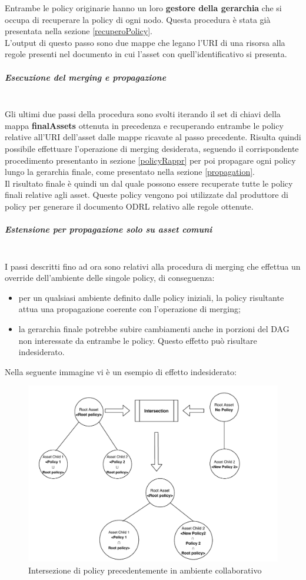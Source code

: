 \documentclass[12pt,a4paper,twoside]{book}
\begin{document}
Entrambe le policy originarie hanno un loro \textbf{gestore della gerarchia} che si occupa di recuperare la policy di ogni nodo. Questa procedura è stata già presentata nella sezione \ref{recuperoPolicy}.\\
L'output di questo passo sono due mappe che legano l'URI di una risorsa alla regole presenti nel documento in cui l'asset con quell'identificativo si presenta. 
\subparagraph{Esecuzione del merging e propagazione}\mbox{}\\
Gli ultimi due passi della procedura sono svolti iterando il set di chiavi della mappa \textbf{finalAssets} ottenuta in precedenza e recuperando entrambe le policy relative all'URI dell'asset dalle mappe ricavate al passo precedente. Risulta quindi possibile effettuare l'operazione di merging desiderata, seguendo il corrispondente procedimento presentanto in sezione \ref{policyRappr} per poi propagare ogni policy lungo la gerarchia finale, come presentato nella sezione \ref{propagation}.\\
Il risultato finale è quindi un  dal quale possono essere recuperate tutte le policy finali relative agli asset. Queste policy vengono poi utilizzate dal produttore di policy per generare il documento ODRL relativo alle regole ottenute.
\subparagraph{Estensione per propagazione solo su asset comuni}\mbox{}\\ \label{estensioneAlg}
I passi descritti fino ad ora sono relativi alla procedura di merging che effettua un override dell'ambiente delle singole policy, di conseguenza:
\begin{itemize}
\item per un qualsiasi ambiente definito dalle policy iniziali, la policy risultante attua una propagazione coerente con l'operazione di merging;
\item la gerarchia finale potrebbe subire cambiamenti anche in porzioni del DAG non interessate da entrambe le policy. Questo effetto può risultare indesiderato.
\end{itemize}\newpage
Nella seguente immagine vi è un esempio di effetto indesiderato:
\begin{figure}[H]
\centering
\includegraphics[scale=.60]{../immagini/wrongProp.pdf}
\caption{Intersezione di policy precedentemente in ambiente collaborativo}
\label{wrongProp}
\end{figure}
\end{document}
